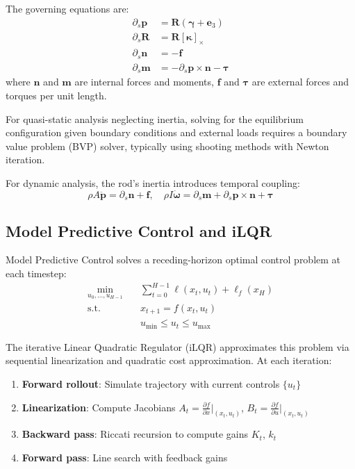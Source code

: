 \documentclass[conference]{IEEEtran}
\begin{document}
The governing equations are:
\begin{align}
\partial_s \mathbf{p} &= \mathbf{R} (\boldsymbol{\gamma} + \mathbf{e}_3) \\
\partial_s \mathbf{R} &= \mathbf{R} [\boldsymbol{\kappa}]_\times \\
\partial_s \mathbf{n} &= -\mathbf{f} \\
\partial_s \mathbf{m} &= -\partial_s \mathbf{p} \times \mathbf{n} - \boldsymbol{\tau}
\end{align}
where $\mathbf{n}$ and $\mathbf{m}$ are internal forces and moments, $\mathbf{f}$ and $\boldsymbol{\tau}$ are external forces and torques per unit length.

For quasi-static analysis neglecting inertia, solving for the equilibrium configuration given boundary conditions and external loads requires a boundary value problem (BVP) solver, typically using shooting methods with Newton iteration.

For dynamic analysis, the rod's inertia introduces temporal coupling:
\begin{equation}
\rho A \ddot{\mathbf{p}} = \partial_s \mathbf{n} + \mathbf{f}, \quad \rho I \dot{\boldsymbol{\omega}} = \partial_s \mathbf{m} + \partial_s \mathbf{p} \times \mathbf{n} + \boldsymbol{\tau}
\end{equation}

\subsection{Model Predictive Control and iLQR}

Model Predictive Control solves a receding-horizon optimal control problem at each timestep:
\begin{align}
\min_{u_0, \ldots, u_{H-1}} \quad & \sum_{t=0}^{H-1} \ell(x_t, u_t) + \ell_f(x_H) \\
\text{s.t.} \quad & x_{t+1} = f(x_t, u_t) \\
& u_{\min} \leq u_t \leq u_{\max}
\end{align}

The iterative Linear Quadratic Regulator (iLQR) approximates this problem via sequential linearization and quadratic cost approximation. At each iteration:
\begin{enumerate}
\item \textbf{Forward rollout}: Simulate trajectory with current controls $\{u_t\}$
\item \textbf{Linearization}: Compute Jacobians $A_t = \frac{\partial f}{\partial x}\big|_{(x_t, u_t)}$, $B_t = \frac{\partial f}{\partial u}\big|_{(x_t, u_t)}$
\item \textbf{Backward pass}: Riccati recursion to compute gains $K_t$, $k_t$
\item \textbf{Forward pass}: Line search with feedback gains
\end{enumerate}
\end{document}
